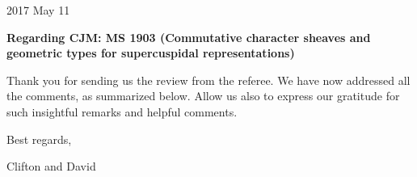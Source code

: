 \documentclass[letter,10pt]{amsart}
\theoremstyle{plain}
\theoremstyle{definition}
\begin{document}
{\hfill {2017 May 11} \\ 
}

\setcounter{equation}{-1}


\noindent\textbf{Regarding CJM: MS 1903 (Commutative character sheaves and geometric types for supercuspidal representations)} %

\bigskip

\medskip


Thank you for sending us the review from the referee. We have now addressed all the comments, as summarized below. Allow us also to express our gratitude for such  insightful remarks and helpful comments.
\medskip

Best  regards,
\bigskip

Clifton and David

\bigskip
\end{document}
